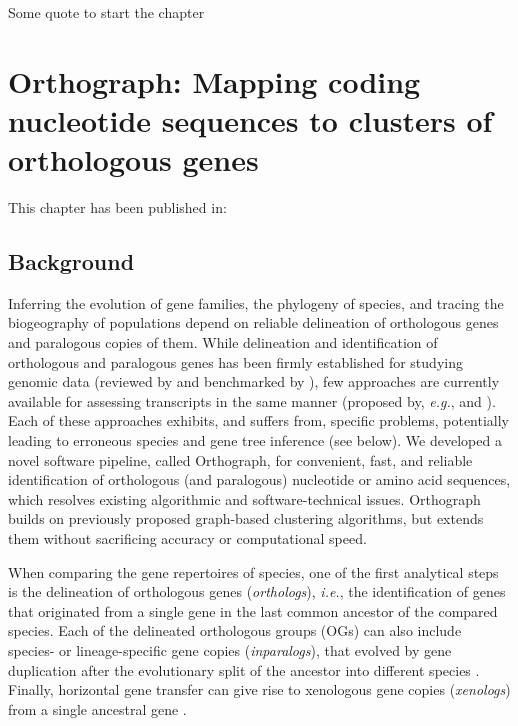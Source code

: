 \begin{savequote}[75mm]
Some quote to start the chapter
\end{savequote}

\chapter{Orthograph: Mapping coding nucleotide sequences to clusters of
orthologous genes}
\label{cha:orthograph}


This chapter has been published in: 

\section{Background}\label{background}

Inferring the evolution of gene families, the phylogeny of species, and
tracing the biogeography of populations depend on reliable delineation
of orthologous genes and paralogous copies of them. While delineation
and identification of orthologous and paralogous genes has been firmly
established for studying genomic data (reviewed by \cite{Kristensen2011}
and benchmarked by \cite{Trachana2011}), few approaches are currently
available for assessing transcripts in the same manner (proposed by,
\emph{e.g.}, \cite{Ebersberger2009} and \cite{Schreiber2009}). Each of
these approaches exhibits, and suffers from, specific problems,
potentially leading to erroneous species and gene tree inference (see
below). We developed a novel software pipeline, called Orthograph, for
convenient, fast, and reliable identification of orthologous (and
paralogous) nucleotide or amino acid sequences, which resolves existing
algorithmic and software-technical issues. Orthograph builds on
previously proposed graph-based clustering algorithms, but extends them
without sacrificing accuracy or computational speed.

When comparing the gene repertoires of species, one of the first
analytical steps is the delineation of orthologous genes
(\emph{orthologs}), \emph{i.e.}, the identification of genes that
originated from a single gene in the last common ancestor of the
compared species. Each of the delineated orthologous groups (OGs) can
also include species- or lineage-specific gene copies
(\emph{inparalogs}), that evolved by gene duplication after the
evolutionary split of the ancestor into different species
\cite{Koonin2005}. Finally, horizontal gene transfer can give rise to
xenologous gene copies (\emph{xenologs}) from a single ancestral gene
\cite{Koonin2005}.


